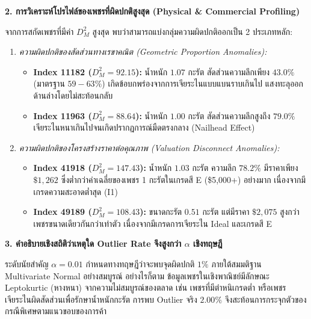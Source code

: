 \documentclass[12pt,a4paper]{article}
\begin{document}
\begin{ansbox}[unbreakable, fontupper={\fontsize{9.6pt}{12.6pt}\selectfont}, left=6pt, right=6pt, top=3pt, bottom=3pt]
\vspace{0.15em}
\noindent\textbf{\normalsize 2. การวิเคราะห์โปรไฟล์ของเพชรที่ผิดปกติสูงสุด (Physical \& Commercial Profiling)}\par\vspace{0.05em}
จากการสกัดเพชรที่มีค่า $D_M^2$ สูงสุด พบว่าสามารถแบ่งกลุ่มความผิดปกติออกเป็น 2 ประเภทหลัก:
\begin{enumerate}[leftmargin=1.2em, itemsep=1.0pt, topsep=1.0pt]
    \item \textit{ความผิดปกติของสัดส่วนทางเรขาคณิต (Geometric Proportion Anomalies):}
    \begin{itemize}[leftmargin=1.0em, itemsep=0.5pt]
        \item \textbf{Index 11182 ($D_M^2 = 92.15$):} น้ำหนัก $1.07$ กะรัต สัดส่วนความลึกเพียง \textbf{$43.0\%$} (มาตรฐาน $59-63\%$) เกิดข้อบกพร่องจากการเจียระไนแบบแบนราบเกินไป แสงทะลุออกด้านล่างโดยไม่สะท้อนกลับ
        \item \textbf{Index 11963 ($D_M^2 = 88.64$):} น้ำหนัก $1.00$ กะรัต สัดส่วนความลึกสูงถึง \textbf{$79.0\%$} เจียระไนหนาเกินไปจนเกิดปรากฏการณ์มืดตรงกลาง (Nailhead Effect)
    \end{itemize}
    \item \textit{ความผิดปกติของโครงสร้างราคาต่อคุณภาพ (Valuation Disconnect Anomalies):}
    \begin{itemize}[leftmargin=1.0em, itemsep=0.5pt]
        \item \textbf{Index 41918 ($D_M^2 = 147.43$):} น้ำหนัก $1.03$ กะรัต ความลึก $78.2\%$ มีราคาเพียง $\$1,262$ ซึ่งต่ำกว่าค่าเฉลี่ยของเพชร 1 กะรัตในเกรดสี E (\$5,000+) อย่างมาก เนื่องจากมีเกรดความสะอาดต่ำสุด (I1)
        \item \textbf{Index 49189 ($D_M^2 = 108.43$):} ขนาดกะรัต $0.51$ กะรัต แต่มีราคา $\$2,075$ สูงกว่าเพชรขนาดเดียวกันกว่าเท่าตัว เนื่องจากมีเกรดการเจียระไน Ideal และเกรดสี E
    \end{itemize}
\end{enumerate}

\vspace{0.15em}
\noindent\textbf{\normalsize 3. คำอธิบายเชิงสถิติว่าเหตุใด Outlier Rate จึงสูงกว่า $\alpha$ เชิงทฤษฎี}\par\vspace{0.05em}
ระดับนัยสำคัญ $\alpha = 0.01$ กำหนดทางทฤษฎีว่าจะพบจุดผิดปกติ $1\%$ ภายใต้สมมติฐาน Multivariate Normal อย่างสมบูรณ์ อย่างไรก็ตาม ข้อมูลเพชรในเชิงพาณิชย์มีลักษณะ Leptokurtic (หางหนา) จากความไม่สมบูรณ์ของตลาด เช่น เพชรที่มีตำหนิเกรดต่ำ หรือเพชรเจียระไนผิดสัดส่วนเพื่อรักษาน้ำหนักกะรัต การพบ Outlier จริง $2.00\%$ จึงสะท้อนการกระจุกตัวของกรณีพิเศษตามแนวขอบของการค้า
\end{ansbox}
\end{document}
